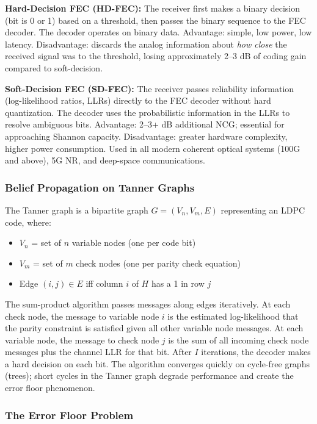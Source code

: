 \documentclass[11pt,letterpaper]{article}
\begin{document}
\textbf{Hard-Decision FEC (HD-FEC):} The receiver first makes a binary decision (bit is 0 or 1) based on a threshold, then passes the binary sequence to the FEC decoder. The decoder operates on binary data. Advantage: simple, low power, low latency. Disadvantage: discards the analog information about \textit{how close} the received signal was to the threshold, losing approximately 2--3 dB of coding gain compared to soft-decision.

\textbf{Soft-Decision FEC (SD-FEC):} The receiver passes reliability information (log-likelihood ratios, LLRs) directly to the FEC decoder without hard quantization. The decoder uses the probabilistic information in the LLRs to resolve ambiguous bits. Advantage: 2--3+ dB additional NCG; essential for approaching Shannon capacity. Disadvantage: greater hardware complexity, higher power consumption. Used in all modern coherent optical systems (100G and above), 5G NR, and deep-space communications.

\subsubsection{Belief Propagation on Tanner Graphs}

The Tanner graph is a bipartite graph $G = (V_n, V_m, E)$ representing an LDPC code, where:
\begin{itemize}[leftmargin=*]
  \item $V_n$ = set of $n$ variable nodes (one per code bit)
  \item $V_m$ = set of $m$ check nodes (one per parity check equation)
  \item Edge $(i,j) \in E$ iff column $i$ of $H$ has a 1 in row $j$
\end{itemize}

The sum-product algorithm passes messages along edges iteratively. At each check node, the message to variable node $i$ is the estimated log-likelihood that the parity constraint is satisfied given all other variable node messages. At each variable node, the message to check node $j$ is the sum of all incoming check node messages plus the channel LLR for that bit. After $I$ iterations, the decoder makes a hard decision on each bit. The algorithm converges quickly on cycle-free graphs (trees); short cycles in the Tanner graph degrade performance and create the error floor phenomenon.

\subsubsection{The Error Floor Problem}
\end{document}
